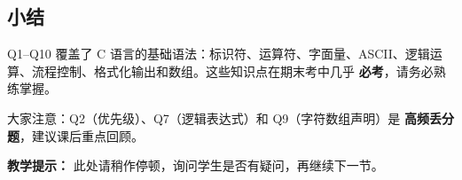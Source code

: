 \subsection{小结}

Q1--Q10 覆盖了 C 语言的基础语法：标识符、运算符、字面量、ASCII、逻辑运算、流程控制、格式化输出和数组。这些知识点在期末考中几乎 \textbf{必考}，请务必熟练掌握。

大家注意：Q2（优先级）、Q7（逻辑表达式）和 Q9（字符数组声明）是 \textbf{高频丢分题}，建议课后重点回顾。

\textbf{教学提示：} 此处请稍作停顿，询问学生是否有疑问，再继续下一节。
